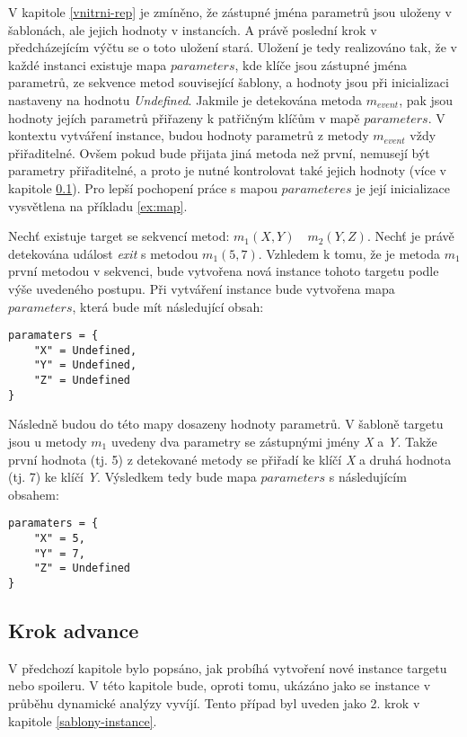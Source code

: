 V kapitole \ref{vnitrni-rep} je zmíněno, že zástupné jména parametrů jsou uloženy v šablonách, ale jejich hodnoty v instancích. A právě poslední krok v předcházejícím výčtu se o toto uložení stará. Uložení je tedy realizováno tak, že v každé instanci existuje mapa $parameters$, kde klíče jsou zástupné jména parametrů, ze sekvence metod související šablony, a hodnoty jsou při inicializaci nastaveny na hodnotu \textit{Undefined}. Jakmile je detekována metoda $m_{event}$, pak jsou hodnoty jejích parametrů přiřazeny k patřičným klíčům v mapě $parameters$. V kontextu vytváření instance, budou hodnoty parametrů z metody $m_{event}$ vždy přiřaditelné. Ovšem pokud bude přijata jiná metoda než první, nemusejí být parametry přiřaditelné, a proto je nutné kontrolovat také jejich hodnoty (více v kapitole \ref{advance}). Pro lepší pochopení práce s mapou $parameteres$ je její inicializace vysvětlena na příkladu \ref{ex:map}. 

\begin{exmp}\label{ex:map}
Nechť existuje target se sekvencí metod: $m_1(X, Y) \quad m_2(Y, Z)$. Nechť je právě detekována událost \textit{exit} s metodou $m_1(5, 7)$. Vzhledem k tomu, že je metoda $m_1$ první metodou v sekvenci, bude vytvořena nová instance tohoto targetu podle výše uvedeného postupu. Při vytváření instance bude vytvořena mapa $parameters$, která bude mít následující obsah:
\begin{lstlisting}
paramaters = {
	"X" = Undefined,
	"Y" = Undefined,
	"Z" = Undefined
}
\end{lstlisting}

Následně budou do této mapy dosazeny hodnoty parametrů. V šabloně targetu jsou u metody $m_1$ uvedeny dva parametry se zástupnými jmény \textit{X} a \textit{Y}. Takže první hodnota (tj. 5) z detekované metody se přiřadí ke klíčí \textit{X} a druhá hodnota (tj. 7) ke klíčí \textit{Y}. Výsledkem tedy bude mapa $parameters$ s následujícím obsahem:

\begin{lstlisting}
paramaters = {
	"X" = 5,
	"Y" = 7,
	"Z" = Undefined
}
\end{lstlisting}

\end{exmp}

\subsection{Krok advance}\label{advance}

V předchozí kapitole bylo popsáno, jak probíhá vytvoření nové instance targetu nebo spoileru. V této kapitole bude, oproti tomu, ukázáno jako se instance v průběhu dynamické analýzy vyvíjí. Tento případ byl uveden jako 2. krok v kapitole \ref{sablony-instance}.

